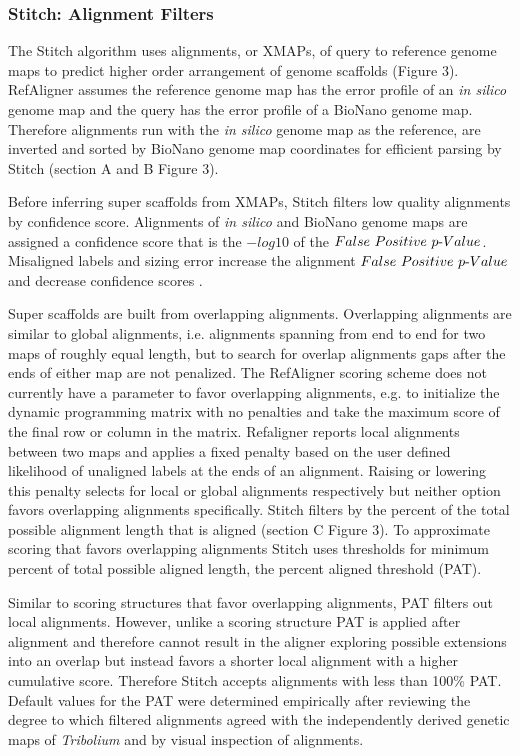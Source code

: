 \documentclass{bmcart}
\begin{document}
\subsubsection*{Stitch: Alignment Filters}

The Stitch algorithm uses alignments, or XMAPs, of query to reference genome maps to predict higher order arrangement of genome scaffolds  (Figure 3). RefAligner assumes the reference genome map has the error profile of an \textit{in silico} genome map and the query has the error profile of a BioNano genome map. Therefore alignments run with the \textit{in silico} genome map as the reference, are inverted and sorted by BioNano genome map coordinates for efficient parsing by Stitch (section A and B Figure 3). 

Before inferring super scaffolds from XMAPs, Stitch filters low quality alignments by confidence score. Alignments of \textit{in silico} and BioNano genome maps are assigned a confidence score that is the $-log10$ of the $False\textnormal{ }Positive\textnormal{ }p\textnormal{-}Value$. Misaligned labels and sizing error increase the alignment $False\textnormal{ }Positive\textnormal{ }p\textnormal{-}Value$ and decrease confidence scores \cite{ProbFP} .

Super scaffolds are built from overlapping alignments. Overlapping alignments are similar to global alignments, i.e. alignments spanning from end to end for two maps of roughly equal length, but to search for overlap alignments gaps after the ends of either map are not penalized. The RefAligner scoring scheme does not currently have a parameter to favor overlapping alignments, e.g. to initialize the dynamic programming matrix with no penalties and take the maximum score of the final row or column in the matrix. Refaligner reports local alignments between two maps and applies a fixed penalty based on the user defined likelihood of unaligned labels at the ends of an alignment. Raising or lowering this penalty selects for local or global alignments respectively but neither option favors overlapping alignments specifically. Stitch filters by the percent of the total possible alignment length that is aligned (section C Figure 3). To approximate scoring that favors overlapping alignments Stitch uses thresholds for minimum percent of total possible aligned length, the percent aligned threshold (PAT). 

Similar to scoring structures that favor overlapping alignments, PAT filters out local alignments. However, unlike a scoring structure PAT is applied after alignment and therefore cannot result in the aligner exploring possible extensions into an overlap but instead favors a shorter local alignment with a higher cumulative score. Therefore Stitch accepts alignments with less than 100\% PAT. Default values for the PAT were determined empirically after reviewing the degree to which filtered alignments agreed with the independently derived genetic maps of \textit{Tribolium} and by visual inspection of alignments.
\end{document}
